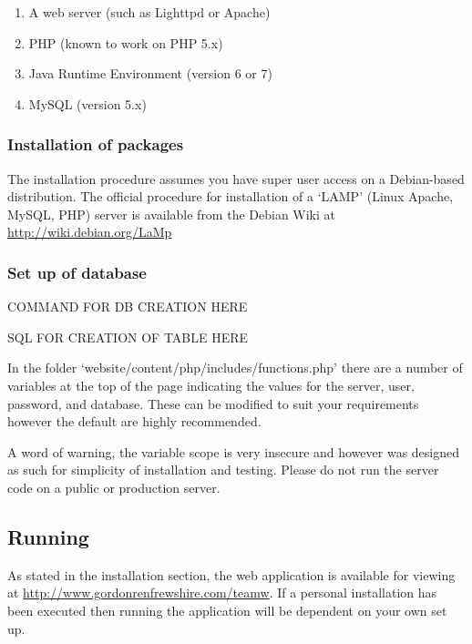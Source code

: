 \begin{enumerate}
\item A web server (such as Lighttpd or Apache)
\item PHP (known to work on PHP 5.x)
\item Java Runtime Environment (version 6 or 7)
\item MySQL (version 5.x)
\end{enumerate}

\subsubsection{Installation of packages}

The installation procedure assumes you have super user access on a Debian-based
distribution. The official procedure for installation of a `LAMP' (Linux
Apache, MySQL, PHP) server is available from the Debian Wiki at
\url{http://wiki.debian.org/LaMp}

\subsubsection{Set up of database}

COMMAND FOR DB CREATION HERE

SQL FOR CREATION OF TABLE HERE

In the folder `website/content/php/includes/functions.php' there are a number
of variables at the top of the page indicating the values for the server, user,
password, and database. These can be modified to suit your requirements however
the default are highly recommended.

A word of warning, the variable scope is very insecure and however was designed
as such for simplicity of installation and testing. Please do not run the server
code on a public or production server.

\subsection{Running}

As stated in the installation section, the web application is available for
viewing at \url{http://www.gordonrenfrewshire.com/teamw}. If a personal
installation has been executed then running the application will be dependent
on your own set up.